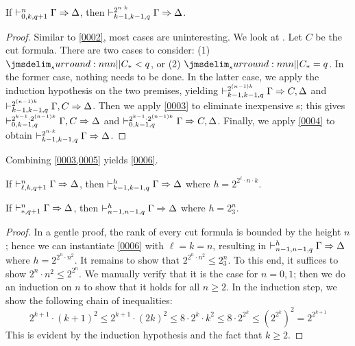 \documentclass[a4paper]{article}
\begin{document}
\begin{lemma}\label{0005}
  If $\mathrel{\vdash^{n}_{0,k,q+1}} \Gamma \Rightarrow \Delta$, then $\mathrel{\vdash^{2^{n \cdot k}}_{k-1,k-1,q}} \Gamma \Rightarrow \Delta$.
\end{lemma}
\begin{proof}
  Similar to \cref{0002}, most cases are uninteresting.
  We look at \rCut.
  Let $C$ be the cut formula.
  There are two cases to consider: (1) $\qRank{C} < q$, or (2) $\qRank{C} = q$.
  In the former case, nothing needs to be done.
  In the latter case, we apply the induction hypothesis on the two premises, yielding $\mathrel{\vdash^{2^{(n-1)k}}_{k-1,k-1,q}} \Gamma \Rightarrow C,\Delta$ and $\mathrel{\vdash^{2^{(n-1)k}}_{k-1,k-1,q}} \Gamma,C \Rightarrow \Delta$.
  Then we apply \cref{0003} to eliminate inexpensive \rCut{}s; this gives $\mathrel{\vdash^{2^{k-1} \cdot 2^{(n-1)k}}_{0,k-1,q}} \Gamma,C \Rightarrow \Delta$ and $\mathrel{\vdash^{2^{k-1} \cdot 2^{(n-1)k}}_{0,k-1,q}} \Gamma \Rightarrow C,\Delta$.
  Finally, we apply \cref{0004} to obtain $\mathrel{\vdash^{2^{n \cdot k}}_{k-1,k-1,q}} \Gamma \Rightarrow \Delta$.
\end{proof}

Combining \cref{0003,0005} yields \cref{0006}.

\begin{corollary}\label{0006}
  If $\mathrel{\vdash^{n}_{\ell,k,q+1}} \Gamma \Rightarrow \Delta$, then $\mathrel{\vdash^{h}_{k-1,k-1,q}} \Gamma \Rightarrow \Delta$ where $h = 2^{2^{\ell} \cdot n \cdot k}$.
\end{corollary}

\begin{lemma}\label{0007}
  If $\mathrel{\vdash^{n}_{\mathord{*},q+1}} \Gamma \Rightarrow \Delta$, then $\mathrel{\vdash^{h}_{n-1,n-1,q}} \Gamma \Rightarrow \Delta$ where $h = 2^n_3$.
\end{lemma}
\begin{proof}
  In a gentle proof, the rank of every cut formula is bounded by the height $n$; hence we can instantiate \cref{0006} with $\ell = k = n$, resulting in $\mathrel{\vdash^{h}_{n-1,n-1,q}} \Gamma \Rightarrow \Delta$ where $h = 2^{2^{n} \cdot n^2}$.
  It remains to show that $2^{2^n \cdot n^2} \leq 2^n_3$.
  To this end, it suffices to show $2^n \cdot n^2 \leq 2^{2^n}$.
  We manually verify that it is the case for $n = 0,1$; then we do an induction on $n$ to show that it holds for all $n \ge 2$.
  In the induction step, we show the following chain of inequalities:
  \[
    2^{k+1} \cdot (k+1)^2 \leq 2^{k+1} \cdot (2k)^2 \leq 8 \cdot 2^k \cdot k^2 \leq 8 \cdot 2^{2^k} \leq (2^{2^k})^2 = 2^{2^{k+1}}
  \]
  This is evident by the induction hypothesis and the fact that $k \geq 2$.
\end{proof}
\end{document}
